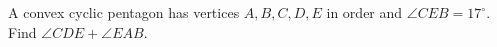 A convex cyclic pentagon has vertices $ A,B,C,D,E $ in order and $\angle CEB=17^\circ $. Find $\angle CDE+\angle EAB $.
